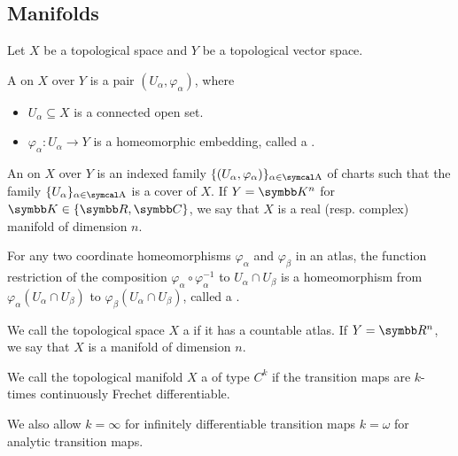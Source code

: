 \subsection{Manifolds}\label{subsec:manifolds}

\begin{definition}\label{def:atlas}\cite[definition 12.1]{Иванов2017}
  Let \( X \) be a topological space and \( Y \) be a topological vector space.

  A  on \( X \) over \( Y \) is a pair \( (U_\alpha, \varphi_\alpha) \), where
  \begin{itemize}
    \item \( U_\alpha \subseteq X \) is a connected open set.
    \item \( \varphi_\alpha: U_\alpha \to Y \) is a homeomorphic embedding, called a .
  \end{itemize}

  An  on \( X \) over \( Y \) is an indexed family \( \{ (U_\alpha, \varphi_\alpha) \}_{\alpha \in \CA} \) of charts such that the family \( \{ U_\alpha \}_{\alpha \in \CA} \) is a cover of \( X \). If \( Y = \BK^n \) for \( \BK \in \{ \BR, \BC \} \), we say that \( X \) is a real (resp. complex) manifold of dimension \( n \).

  For any two coordinate homeomorphisms \( \varphi_\alpha \) and \( \varphi_\beta \) in an atlas, the function restriction of the composition \( \varphi_\alpha \circ \varphi_\alpha^{-1} \) to \( U_\alpha \cap U_\beta \) is a homeomorphism from \( \varphi_\alpha(U_\alpha \cap U_\beta) \) to \( \varphi_\beta(U_\alpha \cap U_\beta) \), called a .
\end{definition}

\begin{definition}\label{def:topological_manifold}\cite[definition 12.4]{Иванов2017}
  We call the topological space \( X \) a  if it has a countable atlas. If \( Y = \BR^n \), we say that \( X \) is a manifold of dimension \( n \).
\end{definition}

\begin{definition}\label{def:differentiable_manifold}\cite[definition 12.6]{Иванов2017}
  We call the topological manifold \( X \) a  of type \( C^k \) if the transition maps are \( k \)-times continuously Frechet differentiable.

  We also allow \( k = \infty \) for infinitely differentiable transition maps \( k = \omega \) for analytic transition maps.
\end{definition}
